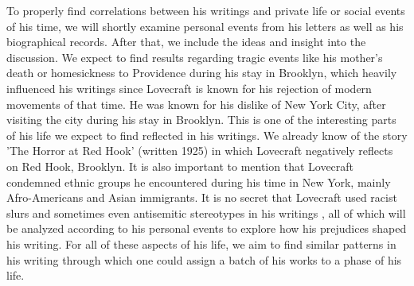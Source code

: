To properly find correlations between his writings and private life or social events of his time, 
we will shortly examine personal events from his letters as well as his biographical records. After 
that, we include the ideas and insight into the discussion. We expect to find results regarding 
tragic events like his mother's death or homesickness to Providence during his stay in Brooklyn, 
which heavily influenced his writings since Lovecraft is known for his rejection of modern 
movements of that time. He was known for his dislike of New York City, after visiting the city 
during his stay in Brooklyn. This is one of the interesting parts of his life we expect to find 
reflected in his writings. We already know of the story 'The Horror at Red Hook' (written 1925) 
in which Lovecraft negatively reflects on Red Hook, Brooklyn. It is also important to mention 
that Lovecraft condemned ethnic groups he encountered during his time in New York, mainly 
Afro-Americans and Asian immigrants. It is no secret that Lovecraft used racist slurs and sometimes 
even antisemitic stereotypes in his writings \cite{romano}, all of which will be analyzed according to his 
personal events to explore how his prejudices shaped his writing. For all of these aspects of his 
life, we aim to find similar patterns in his writing through which one could assign a batch of 
his works to a phase of his life.